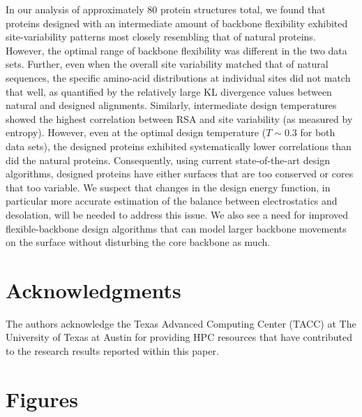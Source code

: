 \documentclass[12pt]{article}
\begin{document}
In our analysis of approximately 80 protein structures total, we found that proteins designed with an intermediate amount of backbone flexibility exhibited site-variability patterns most closely resembling that of natural proteins.  However, the optimal range of backbone flexibility was different in the two data sets. Further, even when the overall site variability matched that of natural sequences, the specific amino-acid distributions at individual sites did not match that well, as quantified by the relatively large KL divergence values between natural and designed alignments. Similarly, intermediate design temperatures showed the highest correlation between RSA and site variability (as measured by entropy). However, even at the optimal design temperature ($T \sim 0.3$ for both data sets), the designed proteins exhibited systematically lower correlations than did the natural proteins. Consequently, using current state-of-the-art design algorithms, designed proteins have either surfaces that are too conserved or cores that too variable. We suspect that changes in the design energy function, in particular more accurate estimation of the balance between electrostatics and desolation, will be needed to address this issue. We also see a need for improved flexible-backbone design algorithms that can model larger backbone movements on the surface without disturbing the core backbone as much.



\section{Acknowledgments}

The authors acknowledge the Texas Advanced Computing Center (TACC) at The University of Texas at Austin for providing HPC resources that have contributed to the research results reported within this paper. 


\cleardoublepage

\section*{Figures}
\end{document}
